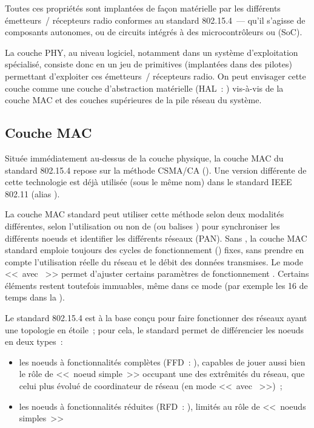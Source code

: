 Toutes ces propriétés sont implantées de façon matérielle par les
différents émetteurs~/ récepteurs radio conformes au standard 802.15.4~---
qu'il s'agisse de composants autonomes, ou de circuits intégrés à des
microcontrôleurs ou  (SoC).

La couche PHY, au niveau logiciel, notamment dans un système d'exploitation
spécialisé, consiste donc en un jeu de primitives (implantées dans des
pilotes) permettant d'exploiter ces émetteurs~/ récepteurs radio. On peut
envisager cette couche comme une couche d'abstraction matérielle
(HAL~: ) vis-à-vis de la couche MAC
et des couches supérieures de la pile réseau du système.


\subsection{Couche MAC}
\label{Subsec802154MAC}

Située immédiatement au-dessus de la couche physique, la couche MAC
du standard 802.15.4 repose sur la méthode CSMA/CA (). Une version différente de
cette technologie est déjà utilisée (sous le même nom) dans le standard
IEEE 802.11 (alias ).

La couche MAC standard peut utiliser cette méthode selon deux modalités
différentes, selon l'utilisation ou non de  (ou balises
\footnotemark[1]) pour synchroniser les différents noeuds et identifier
les différents réseaux (PAN). Sans , la couche MAC
standard emploie toujours des cycles de fonctionnement () fixes, sans prendre en compte l'utilisation réelle du réseau
et le débit des données transmises. Le mode <<~avec ~>>
permet d'ajuster certains paramètres de fonctionnement \cite{TheseSKhssibi}.
Certains éléments restent toutefois immuables, même dans ce mode (par
exemple les 16  de temps dans la ).


Le standard 802.15.4 est à la base conçu pour faire fonctionner des réseaux
ayant une topologie en étoile~; pour cela, le standard permet de
différencier les noeuds en deux types~:

\begin{itemize}

\item les noeuds à fonctionnalités complètes (FFD~: ), capables de jouer aussi bien le rôle de <<~noeud simple~>>
occupant une des extrêmités du réseau, que celui plus évolué de coordinateur
de réseau (en mode <<~avec ~>>)~;

\item les noeuds à fonctionnalités réduites (RFD~: ), limités au rôle de <<~noeuds simples~>>

\end{itemize}


